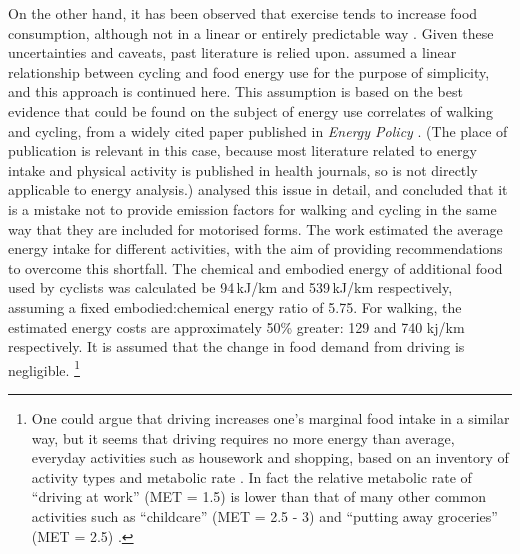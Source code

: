 On the other hand, it has been observed that exercise tends to increase food
consumption, although not in a linear or entirely predictable way \citep{Melzer2005}.
Given these uncertainties and caveats, past literature is relied upon.
\citet{Lovelace2011-assessing} assumed a linear %
relationship between cycling and food energy use for the purpose of simplicity,
and this approach is continued here.
This assumption is based on the best evidence that could be found on the
subject of energy use correlates of walking and cycling,
from a widely cited paper published in \emph{Energy Policy}
\citep{Coley2002}. (The place of publication
is relevant in this case, because most literature related to energy intake and
physical activity is published in health journals, so is not directly
applicable to energy analysis.)
\citet{Coley2002} analysed this issue in detail, and concluded that it
is a mistake not to provide emission factors for walking and cycling in the
same way that they are included for motorised forms. The work estimated the
average energy intake for different activities, with the aim of providing
recommendations to overcome this shortfall.
The chemical and embodied energy of additional food used by
cyclists was calculated be 94\,kJ/km and 539\,kJ/km respectively,
assuming a fixed embodied:chemical energy ratio of 5.75.
For walking, the estimated energy costs are approximately 50\% greater:
129 and 740 kj/km respectively.
It is assumed that the change in food demand from driving is negligible.%
\footnote{One
could argue that driving increases one's marginal food intake in
a similar way, but it seems that driving requires no more energy than average,
everyday activities such as housework and shopping, based on an inventory of
activity types and metabolic rate \citep{Ainsworth2000}. In fact the relative
metabolic rate of ``driving at work'' (MET = 1.5) is lower than that of many
other common activities such as ``childcare'' (MET = 2.5 - 3) and ``putting
away groceries'' (MET = 2.5) \citep{Ainsworth2003}.
}

